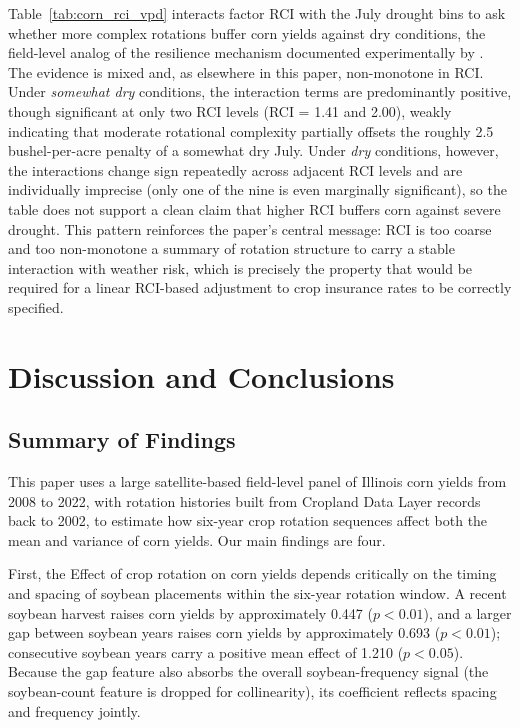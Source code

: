 \documentclass[12pt,letterpaper]{article}
\theoremstyle{remark}
\theoremstyle{remark}
\theoremstyle{plain}
\theoremstyle{definition}
\begin{document}
Table~\ref{tab:corn_rci_vpd} interacts factor RCI with the July drought bins to ask whether more complex rotations buffer corn yields against dry conditions, the field-level analog of the resilience mechanism documented experimentally by \citet{bowles2020}. The evidence is mixed and, as elsewhere in this paper, non-monotone in RCI. Under \emph{somewhat dry} conditions, the interaction terms are predominantly positive, though significant at only two RCI levels (RCI = 1.41 and 2.00), weakly indicating that moderate rotational complexity partially offsets the roughly 2.5 bushel-per-acre penalty of a somewhat dry July. Under \emph{dry} conditions, however, the interactions change sign repeatedly across adjacent RCI levels and are individually imprecise (only one of the nine is even marginally significant), so the table does not support a clean claim that higher RCI buffers corn against severe drought. This pattern reinforces the paper's central message: RCI is too coarse and too non-monotone a summary of rotation structure to carry a stable interaction with weather risk, which is precisely the property that would be required for a linear RCI-based adjustment to crop insurance rates to be correctly specified.

\section{\label{sec:conclusions}Discussion and Conclusions}

\subsection{\label{susec:summary}Summary of Findings}
 
This paper uses a large satellite-based field-level panel of Illinois corn yields from 2008 to 2022, with rotation histories built from Cropland Data Layer records back to 2002, to estimate how six-year crop rotation sequences affect both the mean and variance of corn yields. Our main findings are four.
 
First, the Effect of crop rotation on corn yields depends critically on the timing and spacing of soybean placements within the six-year rotation window. A recent soybean harvest raises corn yields by approximately 0.447 ($p<0.01$), and a larger gap between soybean years raises corn yields by approximately 0.693 ($p<0.01$); consecutive soybean years carry a positive mean effect of 1.210 ($p<0.05$). Because the gap feature also absorbs the overall soybean-frequency signal (the soybean-count feature is dropped for collinearity), its coefficient reflects spacing and frequency jointly.
\end{document}
